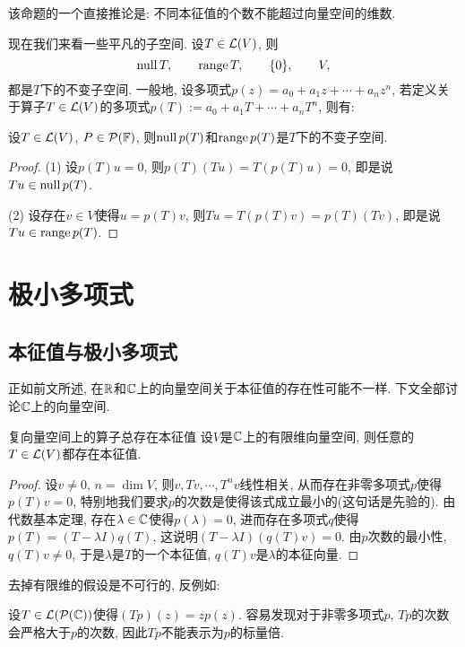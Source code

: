 该命题的一个直接推论是: 不同本征值的个数不能超过向量空间的维数. 

现在我们来看一些平凡的子空间. 设$T \in \mathcal{L} (V)$, 则$$\operatorname{null} T,\qquad \operatorname{range} T,\qquad \{ 0 \},\qquad V,$$
都是$T$下的不变子空间. 一般地, 设多项式$p(z)=a_0+a_1z+\cdots +a_nz^n$, 若定义关于算子$T \in \mathcal{L} (V)$的多项式$p(T):=a_0+a_1T+\cdots +a_nT^n$, 则有: 

\begin{proposition}{}
	设$T \in \mathcal{L} (V)$, $P \in \mathcal{P}(\mathbb{F})$, 则$\operatorname{null} p(T)$和$\operatorname{range} p(T)$是$T$下的不变子空间. 
\end{proposition}
\begin{proof}
	(1) 设$p(T)u=0$, 则$p(T)(Tu)=T(p(T)u)=0$, 即是说$Tu \in \operatorname{null} p(T)$. 
	
	(2) 设存在$v \in V$使得$u=p(T)v$, 则$Tu=T(p(T)v)=p(T)(Tv)$, 即是说$Tu \in \operatorname{range} p(T)$. 
\end{proof}



\newpage
\section{极小多项式}

\subsection{本征值与极小多项式}

正如前文所述, 在$\mathbb{R}$和$\mathbb{C}$上的向量空间关于本征值的存在性可能不一样. 下文全部讨论$\mathbb{C}$上的向量空间. 

\begin{proposition}{复向量空间上的算子总存在本征值} \label{pro:bfvgvidecyzdxk}
	设$V$是$\mathbb{C}$上的有限维向量空间, 则任意的$T \in \mathcal{L} (V)$都存在本征值. 
\end{proposition}
\begin{proof}
	设$v \neq 0$, $n=\dim V$, 则$v,Tv,\cdots ,T^nv$线性相关, 从而存在非零多项式$p$使得$p(T)v=0$, 特别地我们要求$p$的次数是使得该式成立最小的(这句话是先验的). 由代数基本定理, 存在$\lambda \in \mathbb{C}$使得$p(\lambda)=0$, 进而存在多项式$q$使得$p(T)=(T-\lambda I)q(T)$, 这说明$(T-\lambda I)(q(T)v)=0$. 由$p$次数的最小性, $q(T)v \neq 0$, 于是$\lambda$是$T$的一个本征值, $q(T)v$是$\lambda$的本征向量. 
\end{proof}

去掉有限维的假设是不可行的, 反例如: 

\begin{example}
	设$T \in \mathcal{L} (\mathcal{P}(\mathbb{C}))$使得$(Tp)(z)=zp(z)$. 容易发现对于非零多项式$p$, $Tp$的次数会严格大于$p$的次数, 因此$Tp$不能表示为$p$的标量倍. 
\end{example}

